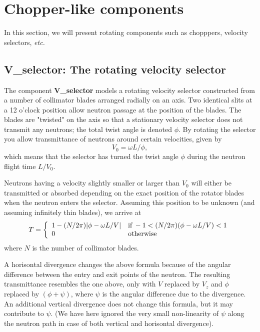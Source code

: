 
\section{Chopper-like components}

In this section, we will present rotating components such as 
chopppers, velocity selectors, {\em etc.}

\subsection{V\_selector: The rotating velocity selector}

The component {\bf V\_selector} models a rotating velocity
selector constructed from a number of collimator blades
arranged radially on an axis. Two identical slits 
at a 12 o'clock position allow
neutron passage at the position of the blades.
The blades are "twisted" on the axis so that a stationary 
velocity selector does not transmit any neutrons; the total
twist angle is denoted $\phi$.
By rotating the selector you allow 
transmittance of neutrons around certain velocities, given by
\begin{equation}
V_0 = \omega L / \phi ,
\end{equation}
which means that the selector has turned the twist angle
$\phi$ during the neutron flight time $L/V_0$.

Neutrons having a velocity slightly smaller or larger than $V_0$ 
will either be transmitted or absorbed depending on the exact position
of the rotator blades when the neutron enters the selector.
Assuming this position to be unknown (and assuming infinitely
thin blades), we arrive at
\begin{equation}
T = \left\{ 
 \begin{array}{ll}
 1 - (N/2\pi ) |\phi-\omega L / V| & 
        {\rm if}\,  -1 < (N/2\pi )(\phi -\omega L / V) < 1 \\
    0  &  {\rm otherwise}
 \end{array} \right.
\end{equation}
where $N$ is the number of collimator blades. 

A horisontal divergence changes the above formula because of the
angular difference between the entry and exit points of the neutron.
The resulting transmittance resembles the one above, only with 
$V$ replaced by $V_z$ and $\phi$ replaced by $(\phi +\psi )$, 
where $\psi$ is the angular difference due to
the divergence. An additional vertical divergence does not change 
this formula, but it may contribute to $\psi$.
(We have here ignored the very small non-linearity of $\psi$ along the
neutron path in case of both vertical and horisontal divergence).

